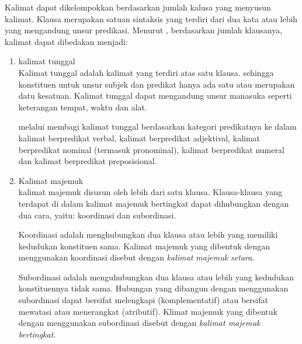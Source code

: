 Kalimat dapat dikelompokkan berdasarkan jumlah kalusa yang menyusun kalimat. Klausa merupakan satuan sintaksis yang terdiri dari dua kata atau lebih yang mengandung unsur predikasi. Menurut \citet{alwi}, berdasarkan jumlah klausanya, kalimat dapat dibedakan menjadi:
\begin{enumerate}
	\item kalimat tunggal\\
	Kalimat tunggal adalah kalimat yang terdiri atas satu klausa. sehingga konstituen untuk unsur subjek dan predikat hanya ada satu atau merupakan datu kesatuan. Kalimat tunggal dapat mengandung unsur manasuka seperti keterangan tempat, waktu dan alat.

	\citet{alwi} melalui \citet{suryawan} membagi kalimat tunggal berdasarkan kategori predikatnya ke dalam kalimat  berpredikat verbal, kalimat berpredikat adjektival, kalimat berpredikat nominal (termasuk pronominal), kalimat berpredikat numeral dan kalimat berpredikat preposisional.

	\item Kalimat majemuk\\
	kalimat majemuk disusun oleh lebih dari satu klausa. Klausa-klausa yang terdapat di dalam kalimat majemuk bertingkat dapat dihubungkan dengan dua cara, yaitu: koordinasi dan subordinasi.

	Koordinasi adalah menghubungkan dua klausa atau lebih yang memiliki kedudukan konstituen sama. Kalimat majemuk yang dibentuk dengan menggunakan koordinasi disebut dengan \emph{kalimat majemuk setara}.

	Subordinasi adalah menguhubungkan dua klausa atau lebih yang kedudukan konstituennya tidak sama. Hubungan yang dibangun dengan menggunakan subordinasi dapat bersifat melengkapi (komplementatif) atau bersifat mewatasi atau menerangkat (atributif). Klimat majemuk yang dibentuk dengan menggunakan subordinasi disebut dengan \emph{kalimat majemuk bertingkat}.
\end{enumerate}

